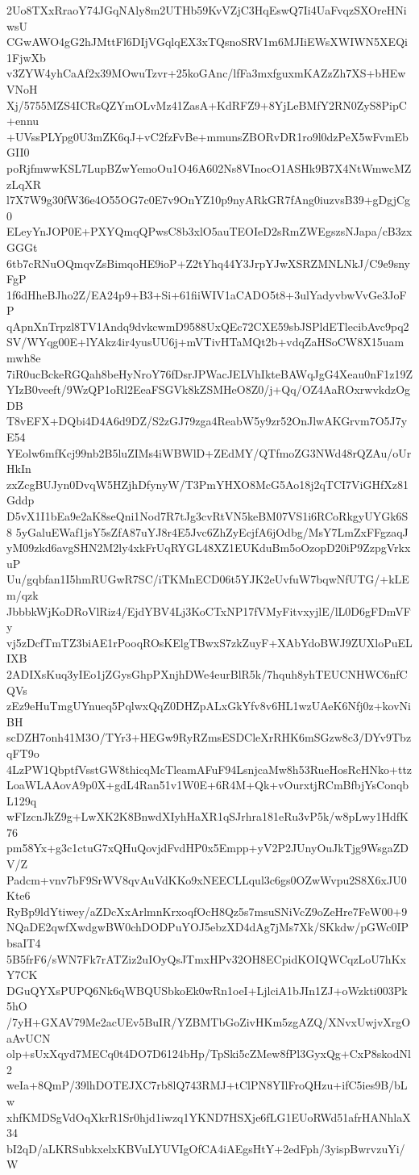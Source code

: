 2Uo8TXxRraoY74JGqNAly8m2UTHb59KvVZjC3HqEswQ7Ii4UaFvqzSXOreHNiwsU
CGwAWO4gG2hJMttFl6DIjVGqlqEX3xTQsnoSRV1m6MJIiEWsXWIWN5XEQi1FjwXb
v3ZYW4yhCaAf2x39MOwuTzvr+25koGAnc/lfFa3mxfguxmKAZzZh7XS+bHEwVNoH
Xj/5755MZS4ICRsQZYmOLvMz41ZasA+KdRFZ9+8YjLeBMfY2RN0ZyS8PipC+ennu
+UVssPLYpg0U3mZK6qJ+vC2fzFvBe+mmunsZBORvDR1ro9l0dzPeX5wFvmEbGII0
poRjfmwwKSL7LupBZwYemoOu1O46A602Ns8VInocO1ASHk9B7X4NtWmwcMZzLqXR
l7X7W9g30fW36e4O55OG7c0E7v9OnYZ10p9nyARkGR7fAng0iuzvsB39+gDgjCg0
ELeyYnJOP0E+PXYQmqQPwsC8b3xlO5auTEOIeD2sRmZWEgszsNJapa/cB3zxGGGt
6tb7cRNuOQmqvZsBimqoHE9ioP+Z2tYhq44Y3JrpYJwXSRZMNLNkJ/C9e9snyFgP
1f6dHheBJho2Z/EA24p9+B3+Si+61fiiWIV1aCADO5t8+3ulYadyvbwVvGe3JoFP
qApnXnTrpzl8TV1Andq9dvkcwmD9588UxQEc72CXE59sbJSPldETlecibAvc9pq2
SV/WYqg00E+lYAkz4ir4yusUU6j+mVTivHTaMQt2b+vdqZaHSoCW8X15uammwh8e
7iR0ucBckeRGQah8beHyNroY76fDsrJPWacJELVhIkteBAWqJgG4Xeau0nF1z19Z
YIzB0veeft/9WzQP1oRl2EeaFSGVk8kZSMHeO8Z0/j+Qq/OZ4AaROxrwvkdzOgDB
T8vEFX+DQbi4D4A6d9DZ/S2zGJ79zga4ReabW5y9zr52OnJlwAKGrvm7O5J7yE54
YEolw6mfKcj99nb2B5luZIMs4iWBWlD+ZEdMY/QTfmoZG3NWd48rQZAu/oUrHkIn
zxZcgBUJyn0DvqW5HZjhDfynyW/T3PmYHXO8McG5Ao18j2qTCI7ViGHfXz81Gddp
D5vX1I1bEa9e2aK8seQni1Nod7R7tJg3cvRtVN5keBM07VS1i6RCoRkgyUYGk6S8
5yGaluEWaf1jsY5sZfA87uYJ8r4E5Jvc6ZhZyEcjfA6jOdbg/MsY7LmZxFFgzaqJ
yM09zkd6avgSHN2M2ly4xkFrUqRYGL48XZ1EUKduBm5oOzopD20iP9ZzpgVrkxuP
Uu/gqbfan1I5hmRUGwR7SC/iTKMnECD06t5YJK2eUvfuW7bqwNfUTG/+kLEm/qzk
JbbbkWjKoDRoVlRiz4/EjdYBV4Lj3KoCTxNP17fVMyFitvxyjlE/lL0D6gFDmVFy
vj5zDcfTmTZ3biAE1rPooqROsKElgTBwxS7zkZuyF+XAbYdoBWJ9ZUXloPuELIXB
2ADIXsKuq3yIEo1jZGysGhpPXnjhDWe4eurBlR5k/7hquh8yhTEUCNHWC6nfCQVs
zEz9eHuTmgUYnueq5PqlwxQqZ0DHZpALxGkYfv8v6HL1wzUAeK6Nfj0z+kovNiBH
scDZH7onh41M3O/TYr3+HEGw9RyRZmsESDCleXrRHK6mSGzw8c3/DYv9TbzqFT9o
4LzPW1QbptfVsstGW8thicqMcTleamAFuF94LsnjcaMw8h53RueHosRcHNko+ttz
LoaWLAAovA9p0X+gdL4Ran51v1W0E+6R4M+Qk+vOurxtjRCmBfbjYsConqbL129q
wFIzcnJkZ9g+LwXK2K8BnwdXIyhHaXR1qSJrhra181eRu3vP5k/w8pLwy1HdfK76
pm58Yx+g3c1ctuG7xQHuQovjdFvdHP0x5Empp+yV2P2JUnyOuJkTjg9WsgaZDV/Z
Padcm+vnv7bF9SrWV8qvAuVdKKo9xNEECLLqul3c6gs0OZwWvpu2S8X6xJU0Kte6
RyBp9ldYtiwey/aZDcXxArlmnKrxoqfOcH8Qz5s7msuSNiVcZ9oZeHre7FeW00+9
NQaDE2qwfXwdgwBW0chDODPuYOJ5ebzXD4dAg7jMs7Xk/SKkdw/pGWc0IPbsaIT4
5B5frF6/sWN7Fk7rATZiz2uIOyQsJTmxHPv32OH8ECpidKOIQWCqzLoU7hKxY7CK
DGuQYXsPUPQ6Nk6qWBQUSbkoEk0wRn1oeI+LjlciA1bJIn1ZJ+oWzkti003Pk5hO
/7yH+GXAV79Me2acUEv5BuIR/YZBMTbGoZivHKm5zgAZQ/XNvxUwjvXrgOaAvUCN
olp+sUxXqyd7MECq0t4DO7D6124bHp/TpSki5cZMew8fPl3GyxQg+CxP8skodNl2
weIa+8QmP/39lhDOTEJXC7rb8lQ743RMJ+tClPN8YIlFroQHzu+ifC5ies9B/bLw
xhfKMDSgVdOqXkrR1Sr0hjd1iwzq1YKND7HSXje6fLG1EUoRWd51afrHANhlaX34
bI2qD/aLKRSubkxelxKBVuLYUVIgOfCA4iAEgsHtY+2edFph/3yispBwrvzuYi/W
